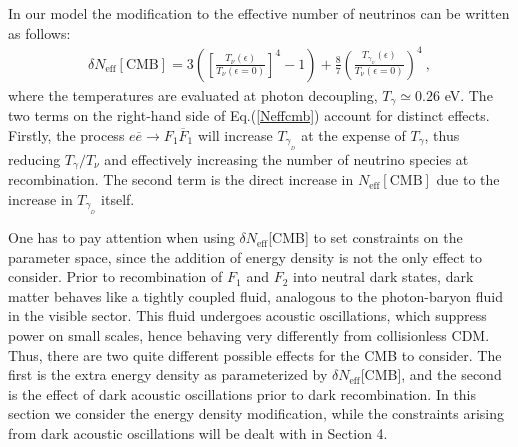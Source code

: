 \documentclass[12pt]{article}
\begin{document}
In our model the modification to the effective number of neutrinos can
be written as follows:
%
\begin{eqnarray}
\delta N _{\text{eff}}[\text{CMB}] = 3 \left (\left [\frac{T _{\nu} (
\epsilon )}{T _{\nu} ( \epsilon = 0)}\right ]^4 - 1 \right ) +
\frac{8}{7} \left ( \frac{T _{\gamma _{_D}} ( \epsilon )}{T _{\nu} (
\epsilon = 0)} \right )^4 \ ,
\label{Neffcmb}
\end{eqnarray}
%
where the temperatures are evaluated at photon decoupling, $T _{\gamma}
\simeq 0.26$ eV. The two terms on the right-hand side of
Eq.(\ref{Neffcmb}) account for distinct effects. Firstly, the process $e
\overline{e} \rightarrow F_1 \overline{F}_1$ will increase $T _{\gamma
_{_D}}$ at the expense of $T _{\gamma}$, thus reducing $T _{\gamma}/T
_{\nu}$ and effectively increasing the number of neutrino species at
recombination. The second term is the direct increase in $N
_{\text{eff}}[\text{CMB}]$ due to the increase in $T _{\gamma _{_D}}$
itself.

One has to pay attention when using $\delta N _{\text{eff}}$[CMB] to set
constraints on the parameter space, since the addition of energy density
is not the
only effect to consider. Prior to recombination of $F _1$ and $F _2$
into neutral dark states, dark matter behaves like a tightly coupled
fluid, analogous to
the photon-baryon fluid in the visible sector. This fluid undergoes
acoustic oscillations, which suppress power on small scales, hence
behaving very
differently from collisionless CDM. Thus, there are two quite different
possible effects for the CMB to consider. The first is the extra energy
density as
parameterized by $\delta N _{\text{eff}}$[CMB], and the second is the
effect of dark acoustic oscillations prior to dark recombination. In
this section we consider the energy density modification, while the
constraints arising from dark acoustic oscillations will be dealt with
in Section 4.
\end{document}
